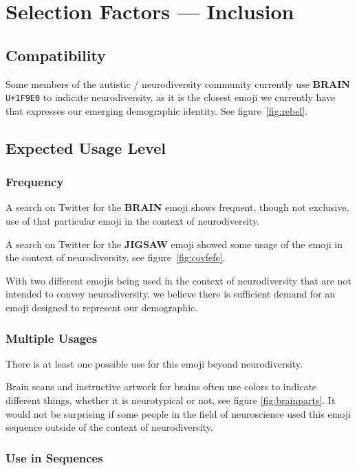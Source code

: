 \section{Selection Factors --- Inclusion}

\subsection{Compatibility}
Some members of the autistic / neurodiversity community currently use \textbf{BRAIN} \texttt{U+1F9E0}
to indicate neurodiversity, as it is the closest emoji we currently have that expresses our
emerging demographic identity. See figure~\ref{fig:rebel}.

\subsection{Expected Usage Level}

\subsubsection{Frequency}

A search on Twitter for the \textbf{BRAIN} emoji shows frequent, though not exclusive, use of
that particular emoji in the context of neurodiversity.

A search on Twitter for the \textbf{JIGSAW} emoji showed some usage of the emoji in the context
of neurodiversity, see figure~\ref{fig:covfefe}.

With two different emojis being used in the context of neurodiversity that are not intended to
convey neurodiversity, we believe there is sufficient demand for an emoji designed to represent
our demographic.

\subsubsection{Multiple Usages}

There is at least one possible use for this emoji beyond neurodiversity.

Brain scans and instructive artwork for brains often use colors to indicate different things,
whether it is neurotypical or not, see figure \ref{fig:brainparts}. It would not be surprising
if some people in the field of neuroscience used this emoji sequence outside of the context
of neurodiversity.

\subsubsection{Use in Sequences}

